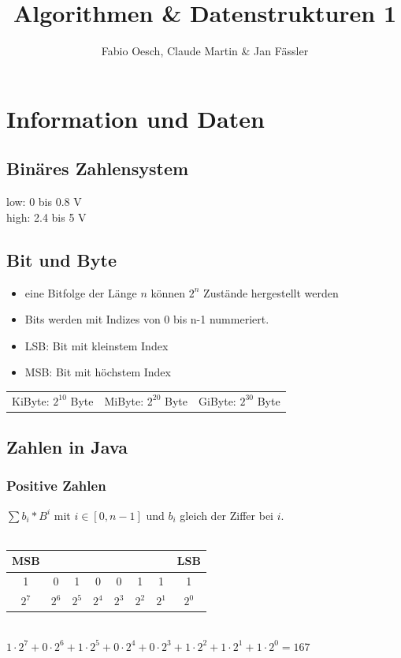 \documentclass[a4paper,10pt]{article}
\author{Fabio Oesch, Claude Martin \& Jan F\"assler}
\title{Algorithmen \& Datenstrukturen 1}
\begin{document}
\maketitle
\newpage

\tableofcontents	  	


\newpage
\setcounter{page}{1}

\section{Information und Daten}
\subsection{Bin\"ares Zahlensystem}
low: 0 bis 0.8 V\\
high: 2.4 bis 5 V\\
\subsection{Bit und Byte}
\begin{itemize}
\item eine Bitfolge der L\"ange $n$ k\"onnen $2^n$ Zust\"ande hergestellt werden
\item Bits werden mit Indizes von 0 bis n-1 nummeriert.
\item LSB: Bit mit kleinstem Index
\item MSB: Bit mit h\"ochstem Index
\end{itemize}
\begin{tabular}{l l l }
	KiByte: $2^{10}$ Byte &
	MiByte: $2^{20}$ Byte &
	GiByte: $2^{30}$ Byte
\end{tabular}

\subsection{Zahlen in Java}
\subsubsection{Positive Zahlen}
$\sum {b_i * B^i}$ mit $i \in [0,n-1]$ und $b_i$ gleich der Ziffer bei $i$. \\\\
\begin{tabular}{|c|c|c|c|c|c|c|c|}
\multicolumn{1}{c}{MSB}&\multicolumn{6}{c}{}&\multicolumn{1}{c}{LSB}\\ \hline
1&0&1&0&0&1&1&1\\\hline
\multicolumn{1}{c}{$2^7$}&\multicolumn{1}{c}{$2^6$}&\multicolumn{1}{c}{$2^5$}&\multicolumn{1}{c}{$2^4$}&\multicolumn{1}{c}{$2^3$}&\multicolumn{1}{c}{$2^2$}&\multicolumn{1}{c}{$2^1$}&\multicolumn{1}{c}{$2^0$}\\
\end{tabular}\\
$1\cdot 2^7+0\cdot 2^6+1\cdot 2^5+0\cdot 2^4+0\cdot 2^3+1\cdot 2^2+1\cdot 2^1+1\cdot 2^0=167$
\end{document}
